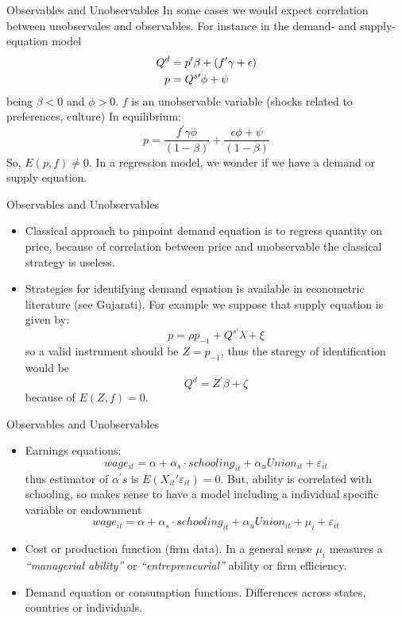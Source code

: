 \begin{frame}{Observables and Unobservables}
	In some cases we would expect correlation between unobservales and observables. For instance in the demand- and supply-equation model
		\begin{align}
			Q^{d} & = p^{\prime }\beta +\left( f^{\prime }\gamma +\epsilon \right) \label{demand equation} \\
			p     & = Q^{s\prime}\phi +\psi  \notag
		\end{align}
	being $\beta <0$ and $\phi >0.$ $f$ is an unobservable variable (shocks related to preferences, culture) In equilibrium:
			$$p=\frac{f^{\prime }\gamma \phi }{\left( 1-\beta \right) }+\frac{\epsilon \phi +\psi }{\left( 1-\beta \right)}$$
	So, $E\left( p,f\right) \not=0.$ In a regression model, we wonder if we have a demand or supply equation.
\end{frame}
\begin{frame}{Observables and Unobservables}
	\begin{itemize}
		\item Classical approach to pinpoint demand equation is to regress quantity on price, because of correlation between price and unobservable the classical strategy is useless.
		\item Strategies for identifying demand equation is available in econometric literature (see Gujarati). For example we suppose that supply equation is given by:
				$$p=\rho p_{-1}+Q^{s\prime }\lambda +\xi$$
		so a valid instrument should be $Z=p_{-1}$, thus the staregy of identification would be%
				$$Q^{d}=Z^{\prime }\beta +\zeta$$
		because of $E\left( Z,f\right) =0.$
	\end{itemize}
\end{frame}
\begin{frame}{Observables and Unobservables}
	\begin{itemize}
		\item Earnings equations:
					$$wage_{it}=\alpha +\alpha _{s}\cdot schooling_{it}+\alpha_{u}Union_{it}+\varepsilon _{it}$$
			  thus estimator of $\alpha ^{\prime }s$ is $E\left( X_{it}\prime \varepsilon_{it}\right) =0.$ But, ability is correlated with schooling, so makes sense to have a model including a individual specific variable or endownment
					$$wage_{it}=\alpha +\alpha _{s}\cdot schooling_{it}+\alpha _{u}Union_{it}+\mu_{i}+\varepsilon _{it}$$
		\item Cost or production function (firm data). In a general sense $\mu _{i}$ measures a \emph{``managerial ability''} or \emph{``entrepreneurial''} ability or firm efficiency.
		\item Demand equation or consumption functions. Differences across states, countries or individuals.
	\end{itemize}
\end{frame}